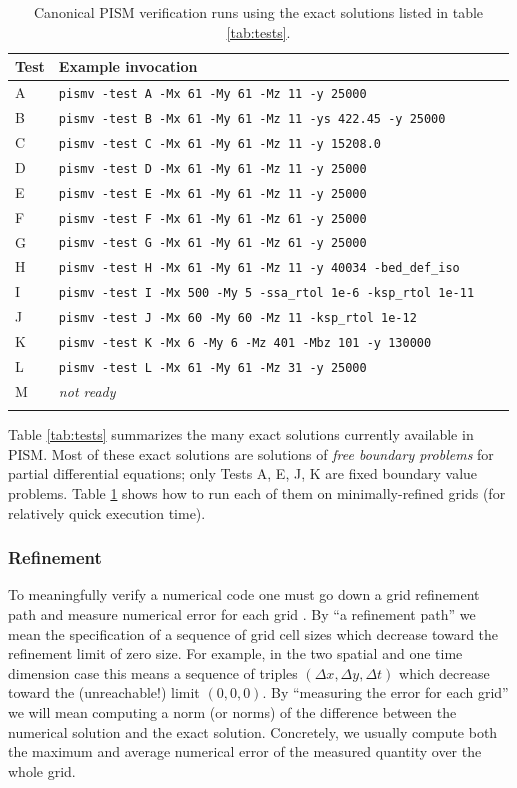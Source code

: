 \documentclass[11pt,final]{amsart}
\begin{document}
\begin{table}[ht]
\caption{Canonical PISM verification runs using the exact solutions listed in table \ref{tab:tests}.}\label{tab:tests_exec}
\small
\begin{tabular}{@{}llll}\hline
\textbf{Test} & \textbf{Example invocation}  \\ \hline
A & \verb|pismv -test A -Mx 61 -My 61 -Mz 11 -y 25000| \\
B & \verb|pismv -test B -Mx 61 -My 61 -Mz 11 -ys 422.45 -y 25000|  \\
C & \verb|pismv -test C -Mx 61 -My 61 -Mz 11 -y 15208.0|  \\
D & \verb|pismv -test D -Mx 61 -My 61 -Mz 11 -y 25000|  \\
E & \verb|pismv -test E -Mx 61 -My 61 -Mz 11 -y 25000|  \\
F & \verb|pismv -test F -Mx 61 -My 61 -Mz 61 -y 25000|  \\
G & \verb|pismv -test G -Mx 61 -My 61 -Mz 61 -y 25000|  \\
H & \verb|pismv -test H -Mx 61 -My 61 -Mz 11 -y 40034 -bed_def_iso| \\
I & \verb|pismv -test I -Mx 500 -My 5 -ssa_rtol 1e-6 -ksp_rtol 1e-11| \\
J & \verb|pismv -test J -Mx 60 -My 60 -Mz 11 -ksp_rtol 1e-12| \\
K & \verb|pismv -test K -Mx 6 -My 6 -Mz 401 -Mbz 101 -y 130000| \\
L & \verb|pismv -test L -Mx 61 -My 61 -Mz 31 -y 25000| \\
M & \emph{not ready} \\
\hline
\normalsize
\end{tabular}
\end{table}

Table \ref{tab:tests} summarizes the many exact solutions currently available in PISM.  Most of these exact solutions are solutions of \emph{free boundary problems} for partial differential equations; only Tests A, E, J, K are fixed boundary value problems.  Table \ref{tab:tests_exec} shows how to run each of them on minimally-refined grids (for relatively quick execution time).

\subsubsection*{Refinement}  To meaningfully verify a numerical code one must go down a grid refinement path and measure numerical error for each grid \cite{Roache}.  By ``a refinement path'' we mean the specification of a sequence of grid cell sizes which decrease toward the refinement limit of zero size.  For example, in the two spatial and one time dimension case this means a sequence of triples $(\Delta x,\Delta y,\Delta t)$ which decrease toward the (unreachable!) limit $(0,0,0)$.  By ``measuring the error for each grid'' we will mean computing a norm (or norms) of the difference between the numerical solution and the exact solution.   Concretely, we usually compute both the maximum and average numerical error of the measured quantity over the whole grid.
\end{document}
